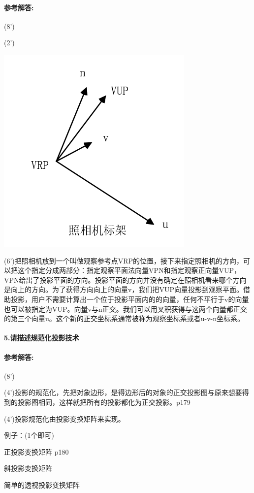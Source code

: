 \documentclass[12pt,a4paper,UTF8]{ctexart}
\begin{document}
	\paragraph{参考解答:}(8')
	\par (2')
	\begin{center}
		\includegraphics[scale=1.0]{zhaoxiangji.png}
	\end{center}
	\par (6')把照相机放到一个叫做观察参考点VRP的位置，接下来指定照相机的方向，可以把这个指定分成两部分：指定观察平面法向量VPN和指定观察正向量VUP，VPN给出了投影平面的方向。投影平面的方向并没有确定在照相机看来哪个方向是向上的方向。为了获得方向向上的向量v，我们把VUP向量投影到观察平面。借助投影，用户不需要计算出一个位于投影平面内的的向量，任何不平行于v的向量也可以被指定为VUP。向量v与n正交。我们可以用叉积获得与这两个向量都正交的第三个向量u。这个新的正交坐标系通常被称为观察坐标系或者u-v-n坐标系。
	\paragraph{5.请描述规范化投影技术}
	\paragraph{参考解答:}(8')
	\par (4')投影的规范化，先把对象边形，是得边形后的对象的正交投影图与原来想要得到的投影图相同，这样就把所有的投影都化为正交投影。p179
	\par (4')投影规范化由投影变换矩阵来实现。
	\par 例子：(1个即可)
	\par 正投影变换矩阵 p180
	\par 斜投影变换矩阵
	\par 简单的透视投影变换矩阵
	
\end{document}
